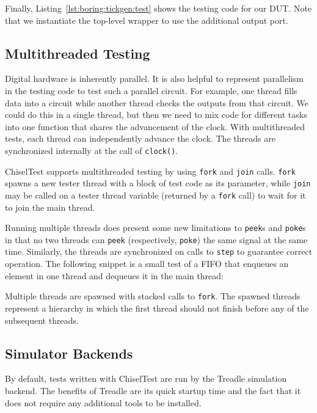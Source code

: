 \documentclass[%
    10pt,
    headinclude, footexclude,
    openright, %
    notitlepage,
    cleardoubleempty,
    headsepline,
    pointlessnumbers,
    bibtotoc, idxtotoc,
    ]{scrbook}
\newcommand{\code}[1]{{\lstinline[basicstyle=\small\ttfamily]{#1}}}
\begin{document}

Finally, Listing~\ref{lst:boring:tickgen:test} shows the testing code for our DUT.
Note that we instantiate the top-level wrapper to use the additional output port.

\subsection{Multithreaded Testing}

Digital hardware is inherently parallel.
It is also helpful to represent parallelism in the testing code to test such a parallel circuit.
For example, one thread fills data into a circuit while another thread checks the outputs from that circuit.
We could do this in a single thread, but then we need to mix code for different tasks
into one function that shares the advancement of the clock.
With multithreaded tests, each thread can independently advance the clock.
The threads are synchronized internally at the call of \code{clock()}.

ChiselTest supports multithreaded testing by using \code{fork} and
\code{join} calls. \code{fork} spawns a new tester thread with a block of test code
as its parameter, while \code{join} may be called on a tester thread variable
(returned by a \code{fork} call) to wait for it to join the main thread.

Running multiple threads does present some new limitations to \code{peek}s and
\code{poke}s in that no two threads can \code{peek} (respectively, \code{poke}) the
same signal at the same time. Similarly, the threads
are synchronized on calls to \code{step} to guarantee correct operation.
The following snippet is a small test of a FIFO that enqueues an element in one thread
and dequeues it in the main thread:


Multiple threads are spawned with stacked calls to \code{fork}. The spawned threads
represent a hierarchy in which the first thread should not finish before any of the
subsequent threads.

\subsection{Simulator Backends}

By default, tests written with ChiselTest are run by the Treadle simulation backend.
The benefits of Treadle are its quick startup time and the fact that it does not require any additional tools to be installed.
\end{document}
